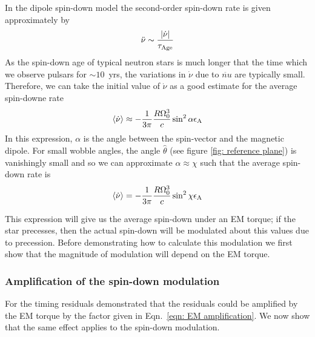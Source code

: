 \documentclass[../full_thesis/full_thesis.tex]{subfiles}
\begin{document}
In the dipole spin-down model the second-order spin-down rate is given
approximately by
\begin{align}
\ddot{\nu} \sim \frac{|\dot{\nu}|}{\tau_{\mathrm{Age}}}
\end{align}
As the spin-down age of typical neutron stars is much longer that
the time which we observe pulsars for $\sim 10$~yrs, the variations in $\dot{\nu}$
due to $\ddot{nu}$ are typically small. Therefore, we can take the initial value
of $\dot{\nu}$ as a good estimate for the average spin-downe rate
\begin{align}
\langle\dot{\nu}\rangle \approx -\frac{1}{3\pi}\frac{R \Omega_{0}^{3}}{c} \sin^{2}\alpha \epsilon_{\mathrm{A}}
    \label{eqn: spin-down initial EM}
\end{align}
In this expression, $\alpha$ is the angle between the spin-vector and the
magnetic dipole. For small wobble angles, the angle $\hat{\theta}$ (see figure
\ref{fig: reference plane}) is vanishingly small and so we can approximate
$\alpha \approx \chi$ such that the average spin-down rate is
\begin{equation}
    \langle \dot{\nu}\rangle = -\frac{1}{3\pi}\frac{R \Omega_{0}^{3}}{c} \sin^{2}\chi \epsilon_{\mathrm{A}}
    \label{eqn: spin-down average}
\end{equation}

This expression will give us the average spin-down under an EM torque; if the
star precesses, then the actual spin-down will be modulated about this values
due to precession. Before demonstrating how to calculate this modulation we
first show that the magnitude of modulation will depend on the EM torque.

\subsubsection{Amplification of the spin-down modulation}

For the timing residuals \citet{Jones2001} demonstrated that the residuals
could be amplified by the EM torque by the factor given in Eqn.~\ref{eqn: EM
amplification}. We now show that the same effect applies
to the spin-down modulation.
\end{document}

